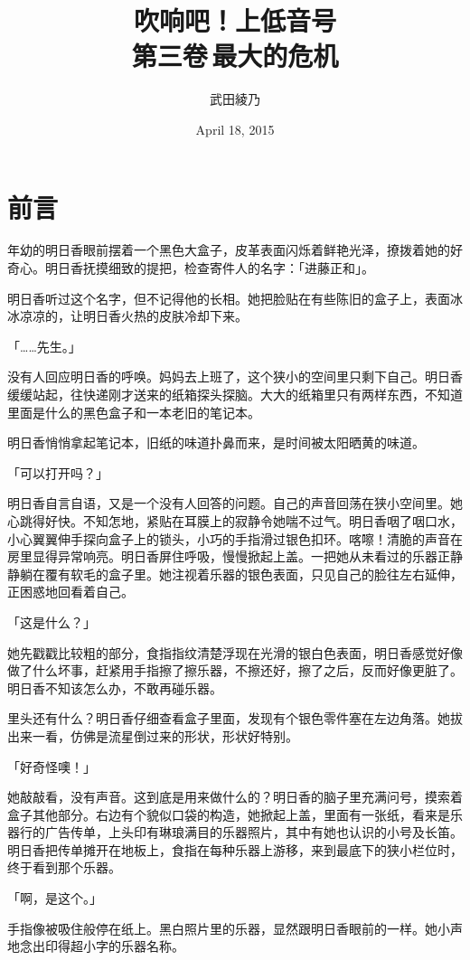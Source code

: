 \documentclass[UTF8]{ctexart}
\title{吹响吧！上低音号\\ \Large{第三卷\,最大的危机}}
\date{April 18, 2015}
\author{武田綾乃}
\begin{document}
    \maketitle
    \tableofcontents
    \setcounter{secnumdepth}{-2}
    \section{前言}
    年幼的明日香眼前摆着一个黑色大盒子，皮革表面闪烁着鲜艳光泽，撩拨着她的好奇心。明日香抚摸细致的提把，检查寄件人的名字：「进藤正和」。 

    明日香听过这个名字，但不记得他的长相。她把脸贴在有些陈旧的盒子上，表面冰冰凉凉的，让明日香火热的皮肤冷却下来。 

    「……先生。」 

    没有人回应明日香的呼唤。妈妈去上班了，这个狭小的空间里只剩下自己。明日香缓缓站起，往快递刚才送来的纸箱探头探脑。大大的纸箱里只有两样东西，不知道里面是什么的黑色盒子和一本老旧的笔记本。 

    明日香悄悄拿起笔记本，旧纸的味道扑鼻而来，是时间被太阳晒黄的味道。 

    「可以打开吗？」 

    明日香自言自语，又是一个没有人回答的问题。自己的声音回荡在狭小空间里。她心跳得好快。不知怎地，紧贴在耳膜上的寂静令她喘不过气。明日香咽了咽口水，小心翼翼伸手探向盒子上的锁头，小巧的手指滑过银色扣环。喀嚓！清脆的声音在房里显得异常响亮。明日香屏住呼吸，慢慢掀起上盖。一把她从未看过的乐器正静静躺在覆有软毛的盒子里。她注视着乐器的银色表面，只见自己的脸往左右延伸，正困惑地回看着自己。 

    「这是什么？」 

    她先戳戳比较粗的部分，食指指纹清楚浮现在光滑的银白色表面，明日香感觉好像做了什么坏事，赶紧用手指擦了擦乐器，不擦还好，擦了之后，反而好像更脏了。明日香不知该怎么办，不敢再碰乐器。 

    里头还有什么？明日香仔细查看盒子里面，发现有个银色零件塞在左边角落。她拔出来一看，仿佛是流星倒过来的形状，形状好特别。 

    「好奇怪噢！」 

    她敲敲看，没有声音。这到底是用来做什么的？明日香的脑子里充满问号，摸索着盒子其他部分。右边有个貌似口袋的构造，她掀起上盖，里面有一张纸，看来是乐器行的广告传单，上头印有琳琅满目的乐器照片，其中有她也认识的小号及长笛。明日香把传单摊开在地板上，食指在每种乐器上游移，来到最底下的狭小栏位时，终于看到那个乐器。 

    「啊，是这个。」 

    手指像被吸住般停在纸上。黑白照片里的乐器，显然跟明日香眼前的一样。她小声地念出印得超小字的乐器名称。 
\end{document}
